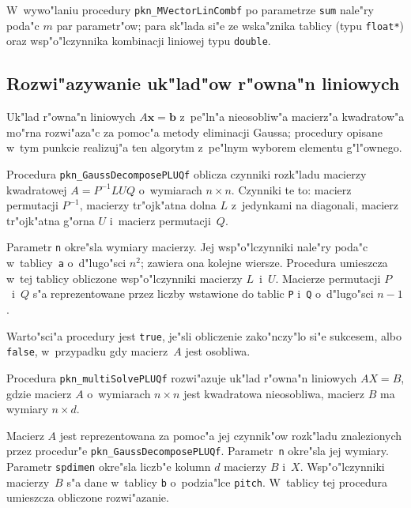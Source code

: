 W~wywo"laniu procedury \texttt{pkn\_MVectorLinCombf} po parametrze
\texttt{sum} nale"ry poda"c $m$ par parametr"ow; para sk"lada si"e ze
wska"znika tablicy (typu \texttt{float*}) oraz wsp"o"lczynnika kombinacji
liniowej typu \texttt{double}.


\subsection{Rozwi"azywanie uk"lad"ow r"owna"n liniowych}

Uk"lad r"owna"n liniowych $A\bm{x}=\bm{b}$ z~pe"ln"a nieosobliw"a macierz"a
kwadratow"a mo"rna rozwi"aza"c za pomoc"a metody eliminacji Gaussa; procedury
opisane w~tym punkcie realizuj"a ten algorytm z~pe"lnym wyborem elementu
g"l"ownego.

\vspace{\bigskipamount}
Procedura \texttt{pkn\_GaussDecomposePLUQf} oblicza czynniki rozk"ladu macierzy
kwadratowej $A=P^{-1}LUQ$ o~wymiarach $n\times n$. Czynniki te to: macierz
permutacji $P^{-1}$, macierzy tr"ojk"atna dolna $L$ z~jedynkami na diagonali,
macierz tr"ojk"atna g"orna $U$ i~macierz permutacji~$Q$.

Parametr \texttt{n} okre"sla wymiary macierzy. Jej wsp"o"lczynniki nale"ry
poda"c w~tablicy~\texttt{a} o~d"lugo"sci $n^2$; zawiera ona kolejne wiersze.
Procedura umieszcza w~tej tablicy obliczone wsp"o"lczynniki macierzy
$L$~i~$U$. Macierze permutacji $P$~i~$Q$ s"a reprezentowane przez liczby
wstawione do tablic \texttt{P} i~\texttt{Q} o~d"lugo"sci $n-1$.

Warto"sci"a procedury jest \texttt{true}, je"sli obliczenie zako"nczy"lo
si"e sukcesem, albo \texttt{false}, w~przypadku gdy macierz~$A$ jest
osobliwa.

\vspace{\bigskipamount}
{}
Procedura \texttt{pkn\_multiSolvePLUQf} rozwi"azuje uk"lad r"owna"n liniowych
$AX=B$, gdzie macierz $A$ o~wymiarach $n\times n$ jest kwadratowa nieosobliwa,
macierz $B$ ma wymiary $n\times d$.

Macierz $A$ jest reprezentowana za pomoc"a jej czynnik"ow rozk"ladu znalezionych
przez procedur"e \texttt{pkn\_GaussDecomposePLUQf}. Parametr~\texttt{n}
okre"sla jej wymiary. Parametr \texttt{spdimen} okre"sla liczb"e kolumn
$d$ macierzy $B$ i~$X$. Wsp"o"lczynniki macierzy~$B$ s"a dane w~tablicy
\texttt{b} o~podzia"lce \texttt{pitch}. W~tablicy tej procedura umieszcza
obliczone rozwi"azanie.


